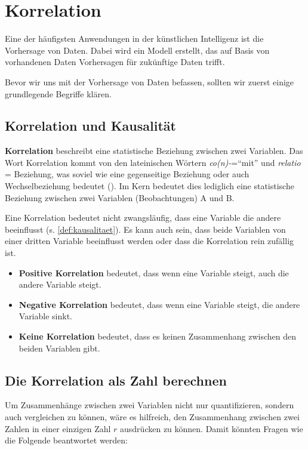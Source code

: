\section{Korrelation}
Eine der häufigsten Anwendungen in der künstlichen Intelligenz ist die Vorhersage von Daten. Dabei wird ein Modell erstellt, das auf Basis von vorhandenen Daten Vorhersagen für zukünftige Daten trifft.

Bevor wir uns mit der Vorhersage von Daten befassen, sollten wir zuerst einige grundlegende Begriffe klären.

\subsection{Korrelation und Kausalität}
\begin{mydefinition}[Korrelation]

\textbf{Korrelation} beschreibt eine statistische Beziehung zwischen zwei Variablen. Das Wort Korrelation kommt von den lateinischen Wörtern \textit{co(n)-}=\enquote{mit} und \textit{relatio} = Beziehung, was soviel wie eine gegenseitige Beziehung oder auch Wechselbeziehung bedeutet (). Im Kern bedeutet dies lediglich eine statistische Beziehung zwischen zwei Variablen (Beobachtungen) A und B.

Eine Korrelation bedeutet nicht zwangsläufig, dass eine Variable die andere beeinflusst (s. \cref{def:kausalitaet}). Es kann auch sein, dass beide Variablen von einer dritten Variable beeinflusst werden oder dass die Korrelation rein zufällig ist.
\begin{itemize}
    \item \textbf{Positive Korrelation} bedeutet, dass wenn eine Variable steigt, auch die andere Variable steigt.
    \item \textbf{Negative Korrelation} bedeutet, dass wenn eine Variable steigt, die andere Variable sinkt.
    \item \textbf{Keine Korrelation} bedeutet, dass es keinen Zusammenhang zwischen den beiden Variablen gibt.
\end{itemize}
\end{mydefinition}

\subsection{Die Korrelation als Zahl berechnen}

Um Zusammenhänge zwischen zwei Variablen nicht nur quantifizieren, sondern auch vergleichen zu können, wäre es hilfreich, den Zusammenhang zwischen zwei Zahlen in einer einzigen Zahl $r$ ausdrücken zu können. Damit könnten Fragen wie die Folgende beantwortet werden:

